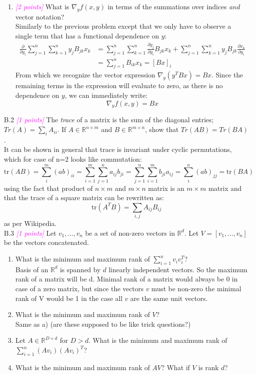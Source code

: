\documentclass{article}
\newcommand{\1}{\mathbf{1}}
\newcommand{\points}[1]{\small\textcolor{magenta}{\emph{[#1 points]}} \normalsize}
\begin{document}
\begin{enumerate}
	\item \points{2} What is $\nabla_y f(x,y)$ in terms of the summations over indices \emph{and} vector notation?\\
	Similarly to the previous problem except that we only have to observe a single term that has a functional dependence on $y$: 
	\begin{align*}
	  \frac{\partial}{\partial y_i}\sum_{j=1}^n\sum_{k=1}^n y_jB_{jk}x_k &= 
	  \sum_{j=1}^n\sum_{k=1}^n \frac{\partial y_j}{\partial y_i}B_{jk}x_k +
	  \sum_{j=1}^n\sum_{k=1}^n y_jB_{jk}\frac{\partial x_k}{\partial y_i} \\
	  &= \sum_{j=1}^n B_{ik}x_k   = \left[Bx\right]_i
	\end{align*}
	From which we recognize the vector expression $\nabla_y (y^TBx) = Bx$. Since the remaining terms in the expression will evaluate to zero, as there is no dependence on $y$, we can immediately write:
	$$\nabla_y f(x,y) = Bx$$
\end{enumerate}

\newpage
B.2 \points{1} The \textit{trace} of a matrix is the sum of the diagonal entries; $Tr(A) = \sum_i A_{ii}$. If $A\in\mathbb{R}^{n\times m}$ and $B\in\mathbb{R}^{m\times n}$, show that $Tr(AB) = Tr(BA)$.\\
It can be shown in general that trace is invariant under cyclic permutations, which for case of n=2 looks like commutation:
$$\text{tr}(AB)=\sum_i^m (ab)_{ii} = \sum_{i=1}^m\sum_{j=1}^n a_{ij}b_{ji}= \sum_{j=1}^n\sum_{i=1}^m b_{ji}a_{ij} = \sum_i^n (ab)_{jj} = \text{tr}(BA)$$
using the fact that product of $n\times m$ and $m\times n$ matrix is an $m\times m$ matrix and that the trace of a square matrix can be rewritten as:
$$\text{tr}(A^TB)=\sum_{i,j}A_{ij}B_{ij}$$
as per Wikipedia.\\

\newpage
B.3 \points{1} Let $v_1,\dots,v_n$ be a set of non-zero vectors in $\mathbb{R}^d$. Let $V = [v_1,\dots,v_n]$ be the vectors concatenated. 
    \begin{enumerate}
        \item What is the minimum and maximum rank of $\sum_{i=1}^n v_i v_i^T$? \\
        Basis of an $\mathbb{R}^d$ is spanned by $d$ linearly independent vectors. So the maximum rank of a matrix will be d. Minimal rank of a matrix would always be 0 in case of a zero matrix, but since the vectors $v$ must be non-zero the minimal rank of V would be 1 in the case all $v$ are the same unit vectors. 
        \item What is the minimum and maximum rank of $V$? \\
        Same as a) (are these supposed to be like trick questions?)
        \item Let $A \in \mathbb{R}^{D \times d}$ for $D > d$. What is the minimum and maximum rank of $\sum_{i=1}^n (A v_i) (A v_i)^T$?
        \item What is the minimum and maximum rank of $AV$? What if $V$ is rank $d$?
    \end{enumerate}
\end{document}
